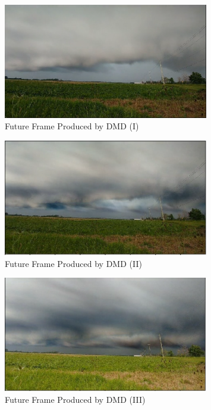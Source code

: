 \documentclass[12pt]{report}
\begin{document}
\begin{figure}[H]
    \centering
    \includegraphics[width=0.8\textwidth]{Weather pics/WS17.png}
    \caption{Future Frame Produced by DMD (I)} \label{fig:WS17}
\end{figure}
\noindent

\begin{figure}[H]
    \centering
    \includegraphics[width=0.8\textwidth]{Weather pics/WS18.png}
    \caption{Future Frame Produced by DMD (II)} \label{fig:WS18}
\end{figure}
\noindent

\begin{figure}[H]
    \centering
    \includegraphics[width=0.8\textwidth]{Weather pics/WS19.png}
    \caption{Future Frame Produced by DMD (III)} \label{fig:WS19}
\end{figure}
\noindent
\end{document}
